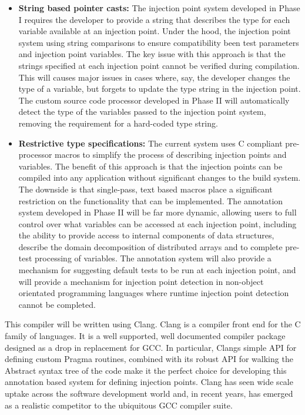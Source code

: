 \begin{itemize}
 \item {\bf String based pointer casts:} The injection point system developed in Phase I requires the developer to provide a string that describes the type for each variable available at an injection point. Under the hood, the injection point system using string comparisons to ensure compatibility been test parameters and injection point variables. The key issue with this approach is that the strings specified at each injection point cannot be verified during compilation.  This will causes major issues in cases where, say, the developer changes the type of a variable, but forgets to update the type string in the injection point. The custom source code processor developed in Phase II will automatically detect the type of the variables passed to the injection point system, removing the requirement for a hard-coded type string. 
  
 \item {\bf Restrictive type specifications:} The current system uses C compliant pre-processor macros to simplify the process of describing injection points and variables. The benefit of this approach is that the injection points can be compiled into any application without significant changes to the build system. The downside is that single-pass, text based macros place a significant restriction on the functionality that can be implemented. The annotation system developed in Phase II will be far more dynamic, allowing users to full control over what variables can be accessed at each injection point, including the ability to provide access to internal components of data structures, describe the domain decomposition of distributed arrays and to complete pre-test processing of variables. The annotation system will also provide a mechanism for suggesting default tests to be run at each injection point, and will provide a mechanism for injection point detection in non-object orientated programming languages where runtime injection point detection cannot be completed.  
\end{itemize}

This compiler will be written using Clang. Clang is a compiler front end for the C family of languages. It is a well supported, well documented compiler package designed as a drop in replacement for GCC. In particular, Clangs simple API for defining custom Pragma routines, combined with its robust API for walking the Abstract syntax tree of the code make it the perfect choice for developing this annotation based system for defining injection points. Clang has seen wide scale uptake across the software development world and, in recent years, has emerged as a realistic competitor to the ubiquitous GCC compiler suite.  

